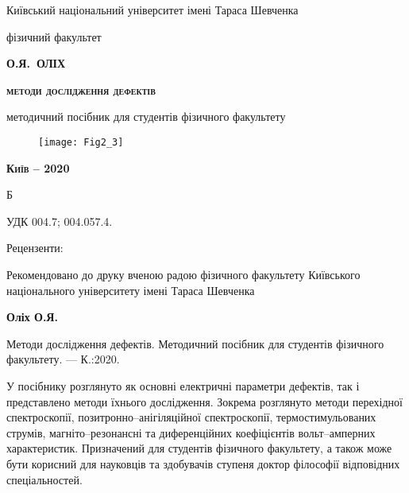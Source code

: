 \begin{titlepage}
\begin{center}

{\small Київський національний університет  імені Тараса Шевченка}

{\small фізичний факультет}


\vspace*{2cm}
{\scshape\bfseries\Large О.Я.~ОЛІХ}

\vspace*{1cm}
{\scshape\bfseries\huge методи дослідження дефектів}

\vspace*{0.5cm}
методичний посібник для студентів фізичного факультету

\end{center}
%
\vspace*{2cm}
\begin{figure}[h]\center
\texttt{[image: Fig2\_3]}
\end{figure}
%
%
\begin{center}

{\scshape\bfseries Київ -- 2020}
\end{center}
\end{titlepage}
Б

УДК 004.7; 004.057.4.

\begin{center}

 \vspace{0.04\textheight}
 Рецензенти:
\end{center}

%

\vspace{1cm}
Рекомендовано до друку вченою радою фізичного факультету
Київського національного університету імені Тараса Шевченка



\vspace{1cm}
\textbf{Оліх О.Я.}

Методи дослідження дефектів. Методичний посібник для студентів фізичного факультету. --- К.:2020.

\vspace{1cm}
У посібнику розглянуто як основні електричні параметри дефектів,
так і представлено методи їхнього дослідження.
Зокрема розглянуто методи перехідної спектроскопії, 
позитронно--анігіляційної спектроскопії,
термостимульованих струмів,
магніто--резонансні
та диференційних коефіцієнтів вольт--амперних характеристик.
Призначений для студентів фізичного факультету, а також
може бути корисний для науковців  та  здобувачів  ступеня  доктор  філософії  
відповідних спеціальностей.